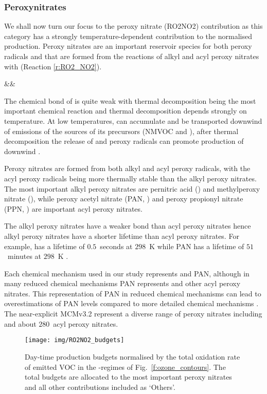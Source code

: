 \subsubsection{Peroxynitrates}
We shall now turn our focus to the peroxy nitrate (RO2NO2) contribution as this category has a strongly temperature-dependent contribution to the normalised  production.
Peroxy nitrates are an important reservoir species for both peroxy radicals and  that are formed from the reactions of alkyl and acyl peroxy nitrates with  (Reaction \ref{r:RO2_NO2}).
\begin{rxnarray}
    &&  \rightleftharpoons {} \label{r:RO2_NO2}
\end{rxnarray}
The chemical bond of  is quite weak with thermal decomposition being the most important chemical reaction and thermal decomposition depends strongly on temperature.
At low temperatures,  can accumulate and be transported downwind of emissions of the sources of its precursors (NMVOC and ), after thermal decomposition the release of  and peroxy radicals can promote production of  downwind \citep{Moxim:1996}.

Peroxy nitrates are formed from both alkyl and acyl peroxy radicals, with the acyl peroxy radicals being more thermally stable than the alkyl peroxy nitrates.
The most important alkyl peroxy nitrates are pernitric acid () and methylperoxy nitrate (), while peroxy acetyl nitrate (PAN, ) and peroxy propionyl nitrate (PPN, ) are important acyl peroxy nitrates.

The alkyl peroxy nitrates have a weaker  bond than acyl peroxy nitrates hence alkyl peroxy nitrates have a shorter lifetime than acyl peroxy nitrates.
For example,  has a lifetime of $0.5$~seconds at $298$~K while PAN has a lifetime of $51$~minutes at $298$~K \citep{Orlando:2012}.

Each chemical mechanism used in our study represents  and PAN, although in many reduced chemical mechanisms PAN represents  and other acyl peroxy nitrates.
This representation of PAN in reduced chemical mechanisms can lead to overestimations of PAN levels compared to more detailed chemical mechanisms \citep{Luecken:1999}.
The near-explicit MCMv3.2 represent a diverse range of peroxy nitrates including  and about $280$~acyl peroxy nitrates.

\begin{figure}[t]%
    \centering%
    \caption{Day-time  production budgets normalised by the total oxidation rate of emitted VOC in the -regimes of Fig.~\ref{f:ozone_contours}. The total budgets are allocated to the most important peroxy nitrates and all other contributions included as `Others'.}%
    \label{f:ro2no2_budgets}%
    \texttt{[image: img/RO2NO2\_budgets]}
\end{figure}

